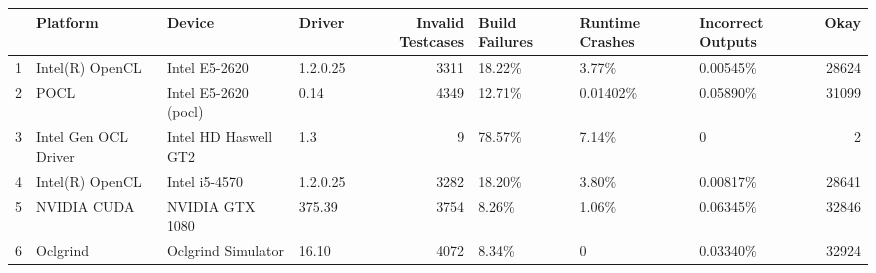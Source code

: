 \begin{tabular}{llllrlllr}
\toprule
{} &              Platform &                Device &    Driver &  Invalid Testcases & Build Failures & Runtime Crashes & Incorrect Outputs &   Okay \\
\midrule
1 &       Intel(R) OpenCL &         Intel E5-2620 &  1.2.0.25 &               3311 &         18.22\% &           3.77\% &          0.00545\% &  28624 \\
2 &                  POCL &  Intel E5-2620 (pocl) &      0.14 &               4349 &         12.71\% &        0.01402\% &          0.05890\% &  31099 \\
3 &  Intel Gen OCL Driver &  Intel HD Haswell GT2 &       1.3 &                  9 &         78.57\% &           7.14\% &                 0 &      2 \\
4 &       Intel(R) OpenCL &         Intel i5-4570 &  1.2.0.25 &               3282 &         18.20\% &           3.80\% &          0.00817\% &  28641 \\
5 &           NVIDIA CUDA &       NVIDIA GTX 1080 &    375.39 &               3754 &          8.26\% &           1.06\% &          0.06345\% &  32846 \\
6 &              Oclgrind &    Oclgrind Simulator &     16.10 &               4072 &          8.34\% &               0 &          0.03340\% &  32924 \\
\bottomrule
\end{tabular}
